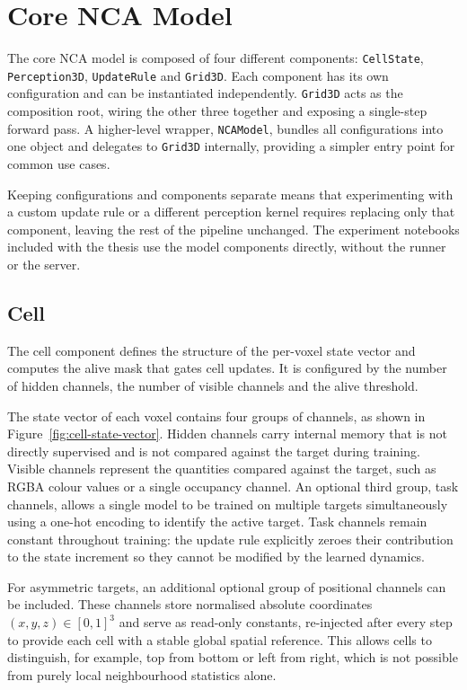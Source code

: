 \section{Core NCA Model}
\label{sec:arch-core-model}

The core NCA model is composed of four different components: \texttt{CellState},
\texttt{Perception3D}, \texttt{UpdateRule} and \texttt{Grid3D}. Each
component has its own configuration and can be instantiated independently.
\texttt{Grid3D} acts as the composition root, wiring the other three together
and exposing a single-step forward pass. A higher-level wrapper,
\texttt{NCAModel}, bundles all configurations into one object and delegates to
\texttt{Grid3D} internally, providing a simpler entry point for common use
cases.

Keeping configurations and components separate means that experimenting with a
custom update rule or a different perception kernel requires replacing only that
component, leaving the rest of the pipeline unchanged. The experiment notebooks
included with the thesis use the model components directly, without the runner
or the server.

\subsection{Cell}

The cell component defines the structure of the per-voxel state vector and
computes the alive mask that gates cell updates. It is configured by the number
of hidden channels, the number of visible channels and the alive threshold.

The state vector of each voxel contains four groups of channels, as shown in
Figure~\ref{fig:cell-state-vector}. Hidden channels carry internal memory that
is not directly supervised and is not compared against the target during
training. Visible channels represent the quantities compared against the
target, such as RGBA colour values or a single occupancy channel. An optional
third group, task channels, allows a single model to be trained on multiple
targets simultaneously using a one-hot encoding to identify the active target.
Task channels remain constant throughout training: the update rule explicitly
zeroes their contribution to the state increment so they cannot be modified
by the learned dynamics.

For asymmetric targets, an additional optional group of positional channels can
be included. These channels store normalised absolute coordinates
$(x, y, z) \in [0,1]^3$ and serve as read-only constants, re-injected after
every step to provide each cell with a stable global spatial reference. This
allows cells to distinguish, for example, top from bottom or left from right,
which is not possible from purely local neighbourhood statistics alone.

